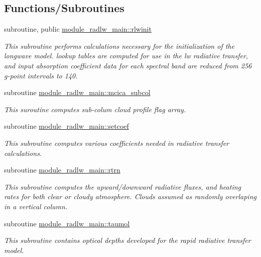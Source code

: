 \subsection*{Functions/\+Subroutines}
\begin{DoxyCompactItemize}
\item 
subroutine, public \hyperlink{group__module__radlw__main_ga1c2cd3b27cfea2743bf34f587cf97ea3}{module\+\_\+radlw\+\_\+main\+::rlwinit}
\begin{DoxyCompactList}\small\item\em This subroutine performs calculations necessary for the initialization of the longwave model. lookup tables are computed for use in the lw radiative transfer, and input absorption coefficient data for each spectral band are reduced from 256 g-\/point intervals to 140. \end{DoxyCompactList}\item 
subroutine \hyperlink{group__module__radlw__main_ga378846d33b06ea00ba43d9c3b4c3a661}{module\+\_\+radlw\+\_\+main\+::mcica\+\_\+subcol}
\begin{DoxyCompactList}\small\item\em This suroutine computes sub-\/colum cloud profile flag array. \end{DoxyCompactList}\item 
subroutine \hyperlink{group__module__radlw__main_ga503a8d3f064dfb4cd4503ae98711bab8}{module\+\_\+radlw\+\_\+main\+::setcoef}
\begin{DoxyCompactList}\small\item\em This subroutine computes various coefficients needed in radiative transfer calculations. \end{DoxyCompactList}\item 
subroutine \hyperlink{group__module__radlw__main_gaa42d8cb56a431d3693d3db44733c11e3}{module\+\_\+radlw\+\_\+main\+::rtrn}
\begin{DoxyCompactList}\small\item\em This subroutine computes the upward/downward radiative fluxes, and heating rates for both clear or cloudy atmosphere. Clouds assumed as randomly overlaping in a vertical column. \end{DoxyCompactList}\item 
subroutine \hyperlink{group__module__radlw__main_gac2fa8768f0911fed5343f643953c780d}{module\+\_\+radlw\+\_\+main\+::taumol}
\begin{DoxyCompactList}\small\item\em This subroutine contains optical depths developed for the rapid radiative transfer model. \end{DoxyCompactList}\item 

\end{DoxyCompactItemize}
